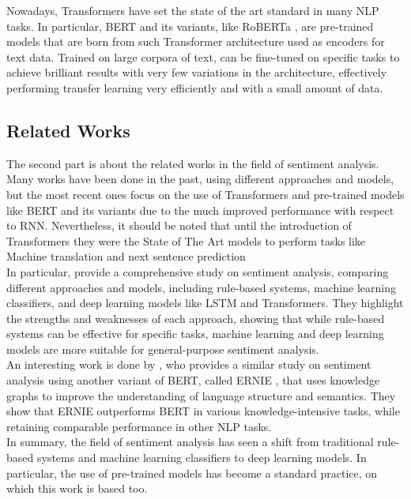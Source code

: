         Nowadays, Transformers have set the state of the art standard in many NLP tasks.
        In particular, BERT \citep{devlin2019bert} and its variants, like RoBERTa \citep{liu2019robertarobustlyoptimizedbert},
        are pre-trained models that are born from such Transformer architecture used
        as encoders for text data. Trained on large corpora of text, can be 
        fine-tuned on specific tasks to achieve brilliant results with very few 
        variations in the architecture, effectively performing transfer learning very
        efficiently and with a small amount of data. \citep{torrey2010transfer}


    \subsection{Related Works}
    \label{sec:related_works}
        The second part is about the related works in the field of sentiment analysis.
        Many works have been done in the past, using different approaches and models,
        but the most recent ones focus on the use of Transformers and pre-trained models
        like BERT and its variants due to the much improved performance with respect
        to RNN. Nevertheless, it should be noted that until the introduction of Transformers
        they were the State of The Art models to perform tasks like Machine translation \citep{cho2014learning}
        and next sentence prediction \citep{ganai2019predicting}\\
        
        In particular, \citet{gupta2024comprehensivestudysentimentanalysis} provide a comprehensive
        study on sentiment analysis, comparing different approaches and models, including
        rule-based systems, machine learning classifiers, and deep learning models like LSTM
        and Transformers. They highlight the strengths and weaknesses of each approach,
        showing that while rule-based systems can be effective for specific tasks, machine learning
        and deep learning models are more suitable for general-purpose sentiment analysis.\\
        
        An interesting work is done by \citet{wen2023sentiment}, who provides a
        similar study on sentiment analysis using another variant of BERT, called
        ERNIE \citep{zhang2019ernieenhancedlanguagerepresentation}, that uses knowledge graphs to improve the understanding of language
        structure and semantics. They show that ERNIE outperforms BERT in various
        knowledge-intensive tasks, while retaining comparable performance in 
        other NLP tasks. \\

        In summary, the field of sentiment analysis has seen a shift from traditional
        rule-based systems and machine learning classifiers to deep learning models.
        In particular, the use of pre-trained models has become a standard practice,
        on which this work is based too. \\ 